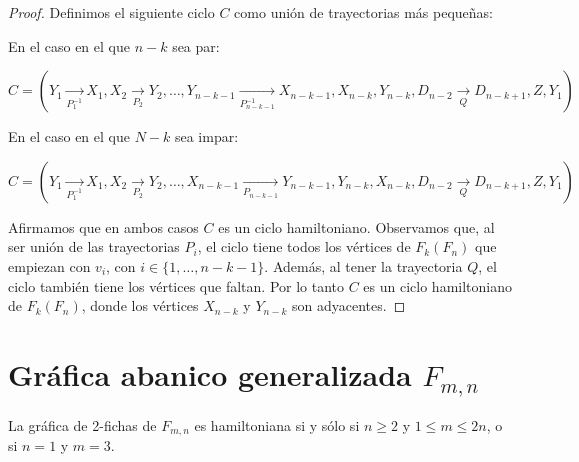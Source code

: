 \begin{proof}
            Definimos el siguiente ciclo $C$ como uni\'on de trayectorias m\'as
            peque\~{n}as: 
    
            En el caso en el que $n-k$ sea par:
            
            $C =(Y_1 \xrightarrow[P_1^{-1}]{} X_1, X_2 \xrightarrow[P_2]{} Y_2,
            \dots, Y_{n-k-1} \xrightarrow[P_{n-k-1}^{-1}]{} X_{n-k-1}, X_{n-k},
            Y_{n-k}, D_{n-2} \xrightarrow[Q]{} D_{n-k+1}, Z, Y_1)$
    
            En el caso en el que $N-k$ sea impar:
    
            $C = (Y_1 \xrightarrow[P_1^{-1}]{} X_1, X_2 \xrightarrow[P_2]{} Y_2,
            \dots, X_{n-k-1} \xrightarrow[P_{n-k-1}]{} Y_{n-k-1}, Y_{n-k},
            X_{n-k}, D_{n-2} \xrightarrow[Q]{} D_{n-k+1}, Z, Y_1)$
    
            Afirmamos que en ambos casos $C$ es un ciclo hamiltoniano.
            Observamos que, al ser uni\'on de las trayectorias $P_i$, el ciclo
            tiene todos los v\'ertices de $F_k(F_n)$ que empiezan con $v_i$, con
            $i \in \{1, \dots, n-k-1\}$. Adem\'as, al tener la trayectoria $Q$,
            el ciclo tambi\'en tiene los v\'ertices que faltan. Por lo tanto $C$
            es un ciclo hamiltoniano de $F_k(F_n)$, donde los v\'ertices
            $X_{n-k}$ y $Y_{n-k}$ son adyacentes. 
    
        \end{proof}

\section{Gr\'afica abanico generalizada $F_{m,n}$}%
\label{sec:GeneralFan}



\begin{teorema}
\label{teo:2-TokGenerFan}
    La gr\'afica de 2-fichas de $F_{m,n}$ es hamiltoniana si y s\'olo si $n \geq
    2$ y $1 \leq m \leq 2n$, o si $n=1$ y $m=3$.
\end{teorema}



